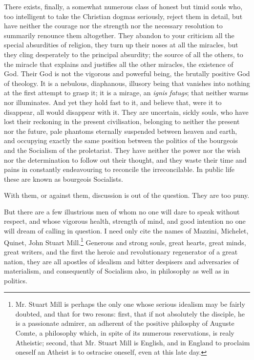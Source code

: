 \documentclass[12pt]{report}
\begin{document}
There exists, finally, a somewhat numerous class of honest but timid souls who, too intelligent to take the Christian dogmas seriously, reject them in detail, but have neither the courage nor the strength nor the necessary resolution to summarily renounce them altogether. They abandon to your criticism all the special absurdities of religion, they turn up their noses at all the miracles, but they cling desperately to the principal absurdity; the source of all the others, to the miracle that explains and justifies all the other miracles, the existence of God. Their God is not the vigorous and powerful being, the brutally positive God of theology. It is a nebulous, diaphanous, illusory being that vanishes into nothing at the first attempt to grasp it; it is a mirage, an \emph{ignis fatugs}; that neither warms nor illuminates. And yet they hold fast to it, and believe that, were it to disappear, all would disappear with it. They are uncertain, sickly souls, who have lost their reckoning in the present civilisation, belonging to neither the present nor the future, pale phantoms eternally suspended between heaven and earth, and occupying exactly the same position between the politics of the bourgeois and the Socialism of the proletariat. They have neither the power nor the wish nor the determination to follow out their thought, and they waste their time and pains in constantly endeavouring to reconcile the irreconcilable. In public life these are known as bourgeois Socialists.


With them, or against them, discussion is out of the question. They are too puny.


But there are a few illustrious men of whom no one will dare to speak without respect, and whose vigorous health, strength of mind, and good intention no one will dream of calling in question. I need only cite the names of Mazzini, Michelet, Quinet, John Stuart Mill.\footnote{Mr. Stuart Mill is perhaps the only one whose serious idealism may be fairly doubted, and that for two resons: first, that if not absolutely the disciple, he is a passionate admirer, an adherent of the positive philosphy of Auguste Comte, a philosophy which, in spite of its numerous reservations, is realy Atheistic; second, that Mr. Stuart Mill is English, and in England to proclaim oneself an Atheist is to ostracise oneself, even at this late day.} Generous and strong souls, great hearts, great minds, great writers, and the first the heroic and revolutionary regenerator of a great nation, they are all apostles of idealism and bitter despisers and adversaries of materialism, and consequently of Socialism also, in philosophy as well as in politics.
\end{document}
